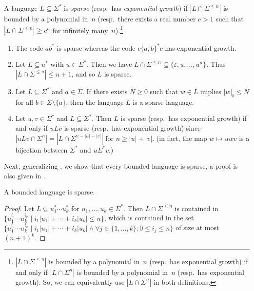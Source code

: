 

A language $L \subseteq \Sigma^*$ is \emph{sparse} (resp.~has \emph{exponential growth})
if $|L \cap \Sigma^{\le n}|$ is bounded by a polynomial in~$n$ (resp.~there exists a real number $c > 1$ such that $|L \cap \Sigma^{\le n}| \ge c^n$ for infinitely many~$n$).\footnote{$|L \cap \Sigma^{\le n}|$ is bounded by a polynomial in~$n$ (resp.~has exponential growth)	if and only if $|L \cap \Sigma^n|$ is bounded by a polynomial in~$n$ (resp.~has exponential growth). So, we can equivalently use $|L \cap \Sigma^n|$ in both definitions.}

\begin{example}
	\label{ex:only_one_letter_infinitely}
	\begin{enumerate}
	\item The code $ab^*$ is sparse whereas the code $c\{a,b\}^*c$
	has exponential growth.
	
	\item \label{ex:only_one_letter_infinitely:2} Let $L \subseteq u^*$ with $u \in \Sigma^*$.
	Then we have $L \cap \Sigma^{\le n} \subseteq \{\varepsilon, u, \ldots, u^n\}$.
	Thus $|L \cap \Sigma^{\le n}| \le n + 1$,
	and so $L$ is sparse.
	
	\item  \label{ex:only_one_letter_infinitely:3}	Let $L \subseteq \Sigma^*$ and $a \in \Sigma$. If there
	exists $N \ge 0$ such that
	$w \in L$
	implies $|w|_b \le N$
	for all $b \in \Sigma \setminus\{a\}$,
	then the language $L$ is a sparse language.
	
	\item \label{ex:only_one_letter_infinitely:4} Let $u,v \in \Sigma^*$ and $L \subseteq \Sigma^*$.
	Then $L$ is sparse (resp.~has exponential growth) if and only if $uLv$
	is sparse (resp.~has exponential growth) since 
	$|uLv \cap \Sigma^n| = |L \cap \Sigma^{n - |u| - |v|}|$ for $n \ge |u| + |v|$. (in fact,
	the map $w \mapsto uwv$ is a bijection between $\Sigma^*$ and $u\Sigma^*v$.)
	\end{enumerate}
\end{example}

Next, generalizing , we show that every bounded language is sparse, a proof is also given in \cite[Prop.~1]{DBLP:journals/tcs/Raz97}.

\begin{proposition} \label{constr_sync:prop:sparse}
	A bounded language is sparse.
\end{proposition}
\begin{proof}
	Let $L \subseteq u_1^* \cdots u_k^*$ for $u_1, \ldots, u_k\in \Sigma^*$.
	Then $L \cap \Sigma^{\le n}$
	is contained in $\{ u_1^{i_1} \cdots u_k^{i_k} \mid i_1 |u_1| + \cdots + i_k |u_k| \le n \}$,
	which is contained
	in the set $\{ u_1^{i_1} \cdots u_k^{i_k} \mid i_1 |u_1| + \cdots + i_k |u_k| \land \forall j \in \{1,\ldots,k\} \colon 0 \le i_j \le n  \}$ of size at most $(n+1)^k$.
\end{proof}

